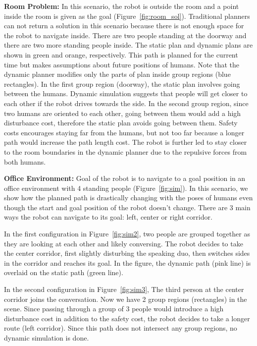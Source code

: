\documentclass[12pt]{gatech-thesis}
\begin{document}
\textbf{Room Problem: } In this scenario, the robot is outside the room and a point inside the room is given as the goal (Figure~\ref{fig:room_sol}). Traditional planners can not return a solution in this scenario because there is not enough space for the robot to navigate inside. There are two people standing at the doorway and there are two more standing people inside. The static plan and dynamic plans are shown in green and orange, respectively. This path is planned for the current time but makes assumptions about future positions of humans. Note that the dynamic planner modifies only the parts of plan inside group regions (blue rectangles). In the first group region (doorway), the static plan involves going between the humans. Dynamic simulation suggests that people will get closer to each other if the robot drives towards the side. In the second group region, since two humans are oriented to each other, going between them would add a high disturbance cost, therefore the static plan avoids going between them. Safety costs encourages staying far from the humans, but not too far because a longer path would increase the path length cost. The robot is further led to stay closer to the room boundaries in the dynamic planner due to the repulsive forces from both humans.

\textbf{Office Environment: } Goal of the robot is to navigate to a goal position in an office environment with 4 standing people (Figure~\ref{fig:sim}). In this scenario, we show how the planned path is drastically changing with the poses of humans even though the start and goal position of the robot doesn't change. There are 3 main ways the robot can navigate to its goal: left, center or right corridor. 

In the first configuration in Figure~\ref{fig:sim2}, two people are grouped together as they are looking at each other and likely conversing. The robot decides to take the center corridor, first slightly disturbing the speaking duo, then switches sides in the corridor and reaches its goal. In the figure, the dynamic path (pink line) is overlaid on the static path (green line). 

In the second configuration in Figure~\ref{fig:sim3}, The third person at the center corridor joins the conversation. Now we have 2 group regions (rectangles) in the scene. Since passing through a group of 3 people would introduce a high disturbance cost in addition to the safety cost, the robot decides to take a longer route (left corridor). Since this path does not intersect any group regions, no dynamic simulation is done.
\end{document}
